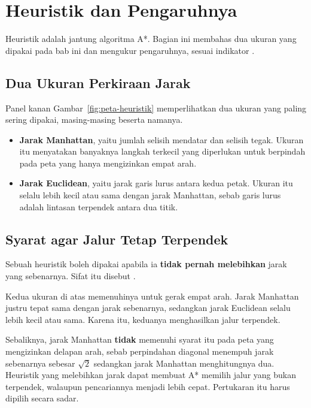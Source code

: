 \section{Heuristik dan Pengaruhnya}
\label{sec:heuristik}

Heuristik adalah jantung algoritma A*. Bagian ini membahas dua ukuran yang
dipakai pada bab ini dan mengukur pengaruhnya, sesuai indikator .

\subsection{Dua Ukuran Perkiraan Jarak}

Panel kanan Gambar~\ref{fig:peta-heuristik} memperlihatkan dua ukuran yang
paling sering dipakai, masing-masing beserta namanya.

\begin{itemize}
  \item \textbf{Jarak Manhattan}, yaitu jumlah selisih mendatar dan selisih
        tegak. Ukuran itu menyatakan banyaknya langkah terkecil yang diperlukan
        untuk berpindah pada peta yang hanya mengizinkan empat arah.
  \item \textbf{Jarak Euclidean}, yaitu jarak garis lurus antara kedua petak.
        Ukuran itu selalu lebih kecil atau sama dengan jarak Manhattan, sebab
        garis lurus adalah lintasan terpendek antara dua titik.
\end{itemize}

\subsection{Syarat agar Jalur Tetap Terpendek}

Sebuah heuristik boleh dipakai apabila ia \textbf{tidak pernah melebihkan}
jarak yang sebenarnya. Sifat itu disebut .

Kedua ukuran di atas memenuhinya untuk gerak empat arah. Jarak Manhattan justru
tepat sama dengan jarak sebenarnya, sedangkan jarak Euclidean selalu lebih kecil
atau sama. Karena itu, keduanya menghasilkan jalur terpendek.

Sebaliknya, jarak Manhattan \textbf{tidak} memenuhi syarat itu pada peta yang
mengizinkan delapan arah, sebab perpindahan diagonal menempuh jarak sebenarnya
sebesar $\sqrt{2}$ sedangkan jarak Manhattan menghitungnya dua. Heuristik yang
melebihkan jarak dapat membuat A* memilih jalur yang bukan terpendek, walaupun
pencariannya menjadi lebih cepat. Pertukaran itu harus dipilih secara sadar.


